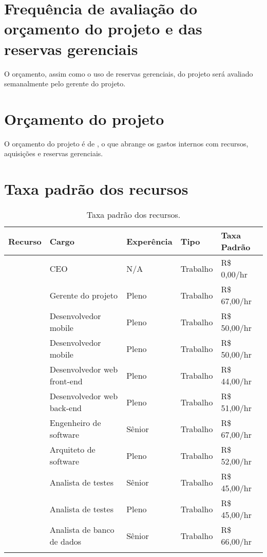 \section{Frequência de avaliação do orçamento do projeto e das reservas gerenciais}

O orçamento, assim como o uso de reservas gerenciais, do projeto será avaliado semanalmente pelo gerente do projeto.

\section{Orçamento do projeto}

O orçamento do projeto é de \realBudget{}, o que abrange os gastos internos com recursos, aquisições e reservas gerenciais.

\section{Taxa padrão dos recursos}

\begin{longtable}{ p{} p{} l l l }
	\toprule
	\textbf{Recurso}      & \textbf{Cargo}              & \textbf{Experência} & \textbf{Tipo} & \textbf{Taxa Padrão} \\
	\midrule
	\ceoName{}            & CEO                         & N/A                  & Trabalho      & R\$ 0,00/hr           \\
	\midrule
	\projectManagerName{} & Gerente do projeto          & Pleno                & Trabalho      & R\$ 67,00/hr          \\
	\midrule
	\mobDevOneName{}      & Desenvolvedor mobile        & Pleno                & Trabalho      & R\$ 50,00/hr          \\
	\midrule
	\mobDevTwoName{}      & Desenvolvedor mobile        & Pleno                & Trabalho      & R\$ 50,00/hr          \\
	\midrule
	\frontWebDevName{}    & Desenvolvedor web front-end & Pleno                & Trabalho      & R\$ 44,00/hr          \\
	\midrule
	\backWebDevName{}     & Desenvolvedor web back-end  & Pleno                & Trabalho      & R\$ 51,00/hr          \\
	\midrule
	\softEngName{}        & Engenheiro de software      & Sênior              & Trabalho      & R\$ 67,00/hr          \\
	\midrule
	\softArcName{}        & Arquiteto de software       & Pleno                & Trabalho      & R\$ 52,00/hr          \\
	\midrule
	\testAnalOneName{}    & Analista de testes          & Sênior              & Trabalho      & R\$ 45,00/hr          \\
	\midrule
	\testAnalTwoName{}    & Analista de testes          & Pleno                & Trabalho      & R\$ 45,00/hr          \\
	\midrule
	\dbAnalName{}         & Analista de banco de dados  & Sênior              & Trabalho      & R\$ 66,00/hr          \\
	\bottomrule
	\caption{Taxa padrão dos recursos.}
	\centering
\end{longtable}

